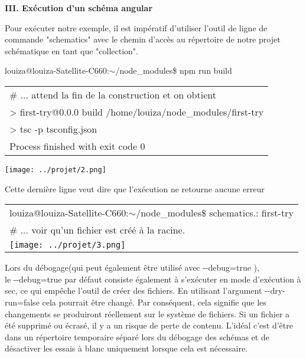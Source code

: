 \documentclass[12pt,french]{article}
\begin{document}
	\textbf{III. Exécution d'un  schéma angular}\newline
	
	Pour exécuter notre exemple, il est impératif d'utiliser l'outil de ligne de commande "schematics" avec le chemin d'accès au répertoire de notre projet \\schématique en tant que "collection".\newline  
	
	louiza@louiza-Satellite-C660:$\sim$/node\_modules\$ npm run build \newline
	
	\begin{tabular}{l}
		\# ... attend la fin de la construction et on obtient\\ 
		\qquad > first-try@0.0.0 build /home/louiza/node\_modules/first-try\\
		\qquad > tsc -p tsconfig.json
\\
		Process finished with exit code 0
	\end{tabular}\break
	
	\texttt{[image: ../projet/2.png]} 

	Cette dernière ligne veut dire que l’exécution ne retourne aucune erreur\newline
	
	\begin{tabular}{l}
		louiza@louiza-Satellite-C660:$\sim$/node\_modules\$ schematics.: first-try \\
		\# ... voir qu'un fichier est créé à la racine. 
		
\\
		\texttt{[image: ../projet/3.png]} 
	\end{tabular}\break

	Lors du débogage(qui peut également être utilisé avec \--\--debug=true ),\\ le \--\--debug=true par défaut consiste également à s'exécuter en mode d'exécution à sec, ce qui empêche l'outil de créer des fichiers.\newline
	En utilisant l'argument \--\--dry-run=false cela pourrait être changé. Par conséquent, cela signifie que les changements se produiront réellement sur le système de fichiers. Si un fichier a été supprimé ou écrasé, il y a un risque de perte de contenu. L'idéal c'est d’être dans un répertoire temporaire séparé lors du débogage des schémas et de désactiver les essais à blanc uniquement lorsque cela est nécessaire.\newline
	
\end{document}
